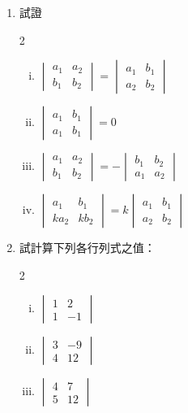 \begin{enumerate}[1.]
  \item 試證
  \begin{multicols}{2}
  \begin{enumerate}[(i)]
    \item $\begin{vmatrix} a_1 & a_2 \\ b_1 & b_2 \end{vmatrix} = \begin{vmatrix} a_1 & b_1 \\ a_2 & b_2 \end{vmatrix}$
    \item $\begin{vmatrix} a_1 & b_1 \\ a_1 & b_1 \end{vmatrix} = 0$
    \item $\begin{vmatrix} a_1 & a_2 \\ b_1 & b_2 \end{vmatrix} = - \begin{vmatrix} b_1 & b_2 \\ a_1 & a_2 \end{vmatrix}$
    \item $\begin{vmatrix} a_1 & b_1 \\ ka_2 & kb_2 \end{vmatrix} = k \begin{vmatrix} a_1 & b_1 \\ a_2 & b_2 \end{vmatrix}$
  \end{enumerate}
  \end{multicols}
  \item 試計算下列各行列式之值：
  \begin{multicols}{2}
  \begin{enumerate}[(i)]
    \item $\begin{vmatrix} 1 & 2 \\ 1 & -1 \end{vmatrix}$
    \item $\begin{vmatrix} 3 & -9 \\ 4 & 12 \end{vmatrix}$
    \item $\begin{vmatrix} 4 & 7 \\ 5 & 12 \end{vmatrix}$

\end{enumerate}
\end{multicols}
\end{enumerate}
